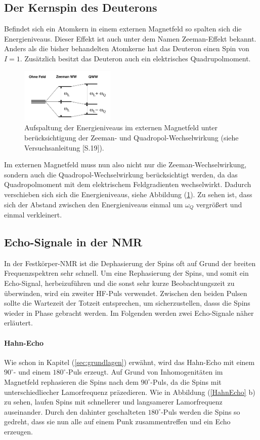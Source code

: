 \subsection{Der Kernspin des Deuterons}
Befindet sich ein Atomkern in einem externen Magnetfeld so spalten sich die Energie{\-}ni{\-}veaus.
Dieser Effekt ist auch unter dem Namen Zeeman-Effekt bekannt.
Anders als die bisher behandelten Atomkerne hat das Deuteron einen Spin von $I = 1$.
Zus\"{a}tzlich besitzt das Deuteron auch ein elektrisches Quadrupolmoment.
\begin{figure}[hbtp]
	\centering
	\includegraphics[width=0.4\textwidth]{Plots/aufspaltung.png}
	\caption{Aufspaltung der Energieniveaus im externen Magnetfeld unter ber\"{u}cksichtigung der Zeeman- und Quadropol-Wechselwirkung (siehe Versuchsanleitung \cite{Anleitung}[S.19]).}
	\label{QWW}
\end{figure}
Im externen Magnetfeld muss nun also nicht nur die Zeeman-Wechselwirkung, sondern auch die Quadropol-Wechselwirkung ber\"{u}cksichtigt werden, da das Quadropolmoment mit dem elektrischem Feldgradienten wechselwirkt.
Dadurch verschieben sich sich die Energieniveaus, siehe Abbildung (\ref{QWW}).
Zu sehen ist, dass sich der Abstand zwischen den Energieniveaus einmal um $\omega_Q$ vergr\"{o}{\ss}ert und einmal verkleinert.

\subsection{Echo-Signale in der NMR}
In der Festk\"{o}rper-NMR ist die Dephasierung der Spins oft auf Grund der breiten Frequenzspektren sehr schnell.
Um eine Rephasierung der Spins, und somit ein Echo-Signal, herbeizuf\"{u}hren und die sonst sehr kurze Beobachtungszeit zu \"{u}berwinden, wird ein zweiter HF-Puls verwendet.
Zwischen den beiden Pulsen sollte die Wartezeit der Totzeit entsprechen, um sicherzustellen, dasss die Spins wieder in Phase gebracht werden.
Im Folgenden werden zwei %
Echo-Signale n\"{a}her erl\"{a}utert.

\paragraph{Hahn-Echo}
Wie schon in Kapitel (\ref{sec:grundlagen}) erw\"{a}hnt, wird das Hahn-Echo mit einem $90^{\circ}$- und einem $180^{\circ}$-Puls erzeugt.
Auf Grund von Inhomogenit\"{a}ten im Magnetfeld rephasieren die Spins nach dem $90^{\circ}$-Puls, da die Spins mit unterschiedliecher Lamorfrequenz pr\"{a}zedieren.
Wie in Abbildung (\ref{HahnEcho} b) zu sehen, laufen Spins mit schnellerer und langsamerer Lamor{\-}fre{\-}quenz auseinander.
Durch den dahinter geschalteten $180^{\circ}$-Puls werden die Spins so gedreht, dass sie nun alle auf einem Punk zusammentreffen und ein Echo erzeugen.

